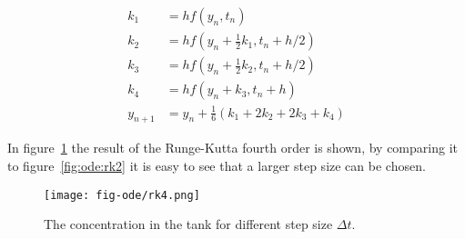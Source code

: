 \documentclass[graybox,sectrefs,envcountresetchap,open=right,final]{svmonodo}
\newenvironment{graybox2admon}[1][]{
\begin{graybox2mdframed}[frametitle=#1]
}
{
\end{graybox2mdframed}
}
\begin{document}
\begin{graybox2admon}[The 4. order Runge-Kutta:]
\begin{align}
k_1&=hf(y_n,t_n)\nonumber\\ 
k_2&=hf(y_n+\frac{1}{2}k_1,t_n+h/2)\nonumber\\ 
k_3&=hf(y_n+\frac{1}{2}k_2,t_n+h/2)\nonumber\\ 
k_4&=hf(y_n+k_3,t_n+h)\nonumber\\ 
y_{n+1}&=y_n+\frac{1}{6}(k_1+2k_2+2k_3+k_4)\label{eq:ode:rk5}
\end{align}
\end{graybox2admon}



In figure~\ref{fig:ode:rk4} the result of the Runge-Kutta fourth order is shown, by comparing it to figure~\ref{fig:ode:rk2} it is easy to see that a larger step size can be chosen.     

\begin{figure}[!ht]  %
  \centerline{\texttt{[image: fig-ode/rk4.png]}}
  \caption{
  The concentration in the tank for different step size $\Delta t$. \label{fig:ode:rk4}
  }
\end{figure}

\end{document}
